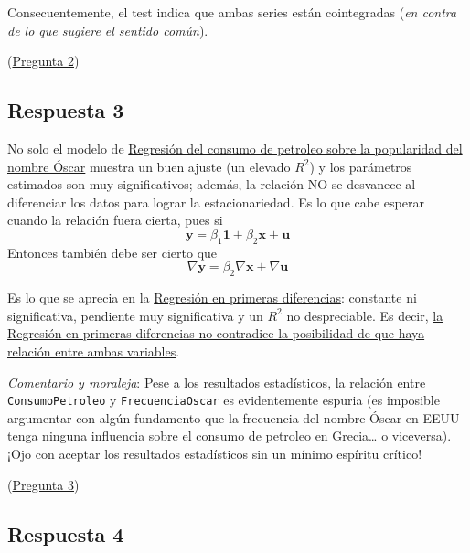 \documentclass[10pt]{article}
\begin{document}
Consecuentemente, el test indica que ambas series están cointegradas
(\emph{en contra de lo que sugiere el sentido común}).

(\hyperref[sec:org89f97d3]{Pregunta 2})
\subsection*{Respuesta 3}
\label{sec:orgd1f6bde}
No solo el modelo de \hyperref[sec:orgd830702]{Regresión del consumo de petroleo sobre la popularidad del nombre Óscar} muestra un buen ajuste (un elevado \(R^2\))
y los parámetros estimados son muy significativos; además, la relación
NO se desvanece al diferenciar los datos para lograr la
estacionariedad. Es lo que cabe esperar cuando la relación fuera cierta,
pues si
$$
\boldsymbol{y}=\beta_1 \boldsymbol{1} + \beta_2 \boldsymbol{x} + \boldsymbol{u}
$$
Entonces también debe ser cierto que
$$
\nabla\boldsymbol{y}= \beta_2 \nabla\boldsymbol{x} + \nabla\boldsymbol{u}
$$

Es lo que se aprecia en la \hyperref[sec:orgbc115b4]{Regresión en primeras diferencias}:
constante ni significativa, pendiente muy significativa y un \(R^2\) no
despreciable. Es decir, \uline{la \hyperref[sec:orgbc115b4]{Regresión en primeras diferencias} no
contradice la posibilidad de que haya relación entre ambas variables}.

\emph{Comentario y moraleja}: Pese a los resultados estadísticos, la
relación entre \texttt{ConsumoPetroleo} y \texttt{FrecuenciaOscar} es evidentemente
espuria (es imposible argumentar con algún fundamento que la
frecuencia del nombre Óscar en EEUU tenga ninguna influencia sobre el
consumo de petroleo en Grecia\ldots{} o viceversa). ¡Ojo con aceptar los
resultados estadísticos sin un mínimo espíritu crítico!

(\hyperref[sec:orga761262]{Pregunta 3})
\subsection*{Respuesta 4}
\label{sec:org656792d}
\end{document}
